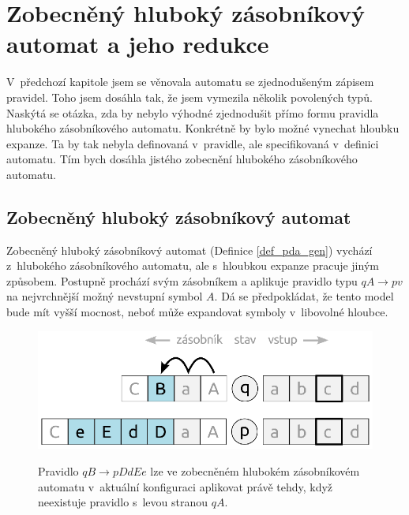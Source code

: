\chapter{Zobecněný hluboký zásobníkový automat a jeho redukce} \label{kap_pda_gen}

V~předchozí kapitole jsem se věnovala automatu se zjednodušeným zápisem pravidel. Toho jsem dosáhla tak, že jsem vymezila několik povolených typů.
Naskýtá se otázka, zda by nebylo výhodné zjednodušit přímo formu pravidla hlubokého zásobníkového automatu. Konkrétně by bylo možné vynechat hloubku expanze. Ta by tak nebyla definovaná v~pravidle, ale specifikovaná v~definici automatu. Tím bych dosáhla jistého zobecnění hlubokého zásobníkového automatu.

\section{Zobecněný hluboký zásobníkový automat}

Zobecněný hluboký zásobníkový automat (Definice \ref{def_pda_gen}) vychází z~hlubokého zásobníkového automatu, ale s~hloubkou expanze pracuje jiným způsobem. Postupně prochází svým zásobníkem a aplikuje pravidlo typu $qA \rightarrow pv$ na nejvrchnější možný nevstupní symbol $A$. Dá se předpokládat, že tento model bude mít vyšší mocnost, neboť může expandovat symboly v~libovolné hloubce.

\begin{figure}[ht]
\centering
\includegraphics{img/bp_pda05.eps} \bigskip \\
\caption{Pravidlo $q B \rightarrow p DdEe$ lze ve zobecněném hlubokém zásobníkovém automatu v~aktuální konfiguraci aplikovat právě tehdy, když neexistuje pravidlo s~levou stranou $qA$.}
\end{figure}

